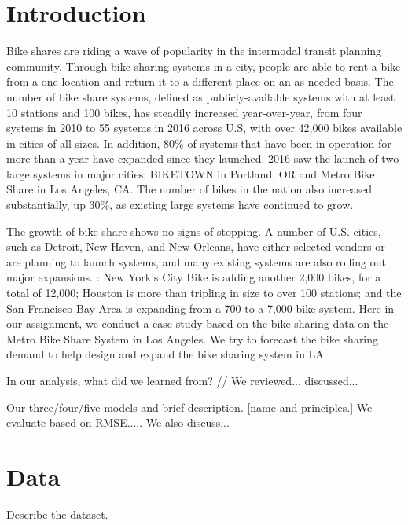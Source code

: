 \section{Introduction}

  \par Bike shares are riding a wave of popularity in the intermodal transit planning community. Through bike sharing systems in a city, people are able to rent a bike from a one location and return it to a different place on an as-needed basis. The number of bike share systems, defined as publicly-available systems with at least 10 stations and 100 bikes, has steadily increased year-over-year, from four systems in 2010 to 55 systems in 2016 across U.S, with over 42,000 bikes available in cities of all sizes. In addition, 80\% of systems that have been in operation for more than a year have expanded since they launched. 2016 saw the launch of two large systems in major cities: BIKETOWN in Portland, OR and Metro Bike Share\cite{bike} in Los Angeles, CA. The number of bikes in the nation also increased substantially, up 30\%, as existing large systems have continued to grow.
  \par The growth of bike share shows no signs of stopping. A number of U.S. cities, such as Detroit, New Haven, and New Orleans, have either selected vendors or are planning to launch systems, and many existing systems are also rolling out major expansions. : New York's City Bike is adding another 2,000 bikes, for a total of 12,000; Houston is more than tripling in size to over 100 stations; and the San Francisco Bay Area is expanding from a 700 to a 7,000 bike system. Here in our assignment, we conduct a case study based on the bike sharing data on the Metro Bike Share System in Los Angeles. We try to forecast the bike sharing demand to help design and expand the bike sharing system in LA. 




  \par In our analysis, what did we learned from? // We reviewed... discussed...

  \par Our three/four/five models and brief description. [name and principles.] We evaluate based on RMSE..... We also discuss...


\section{Data}
  \par Describe the dataset.

